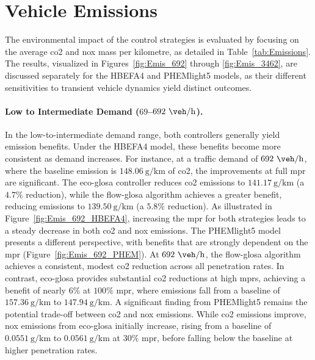 \section{Vehicle Emissions}
\label{sec:Results_Emissions}

The environmental impact of the control strategies is evaluated by focusing on the average \ac{co2} and \ac{nox} mass per kilometre, as detailed in Table~\vref{tab:Emissions}. The results, visualized in Figures~\vref{fig:Emis_692} through \vref{fig:Emis_3462}, are discussed separately for the HBEFA4 and PHEMlight5 models, as their different sensitivities to transient vehicle dynamics yield distinct outcomes.

\paragraph{Low to Intermediate Demand ($69$--$692~\unit{\veh\per\hour}$).}
In the low-to-intermediate demand range, both controllers generally yield emission benefits. Under the HBEFA4 model, these benefits become more consistent as demand increases. For instance, at a traffic demand of $692~\unit{\veh\per\hour}$, where the baseline emission is $148.06~\unit{\gram\per\kilo\metre}$ of \ac{co2}, the improvements at full \ac{mpr} are significant. The \ac{eco-glosa} controller reduces \ac{co2} emissions to $141.17~\unit{\gram\per\kilo\metre}$ (a $4.7\%$ reduction), while the \ac{flow-glosa} algorithm achieves a greater benefit, reducing emissions to $139.50~\unit{\gram\per\kilo\metre}$ (a $5.8\%$ reduction). As illustrated in Figure~\vref{fig:Emis_692_HBEFA4}, increasing the \ac{mpr} for both strategies leads to a steady decrease in both \ac{co2} and \ac{nox} emissions.
\mynewline
The PHEMlight5 model presents a different perspective, with benefits that are strongly dependent on the \ac{mpr} (Figure~\vref{fig:Emis_692_PHEM}). At $692~\unit{\veh\per\hour}$, the \ac{flow-glosa} algorithm achieves a consistent, modest \ac{co2} reduction across all penetration rates. In contrast, \ac{eco-glosa} provides substantial \ac{co2} reductions at high \acp{mpr}, achieving a benefit of nearly $6\%$ at $100\%$ \ac{mpr}, where emissions fall from a baseline of $157.36~\unit{\gram\per\kilo\metre}$ to $147.94~\unit{\gram\per\kilo\metre}$. A significant finding from PHEMlight5 remains the potential trade-off between \ac{co2} and \ac{nox} emissions. While \ac{co2} emissions improve, \ac{nox} emissions from \ac{eco-glosa} initially increase, rising from a baseline of $0.0551~\unit{\gram\per\kilo\metre}$ to $0.0561~\unit{\gram\per\kilo\metre}$ at $30\%$ \ac{mpr}, before falling below the baseline at higher penetration rates.

